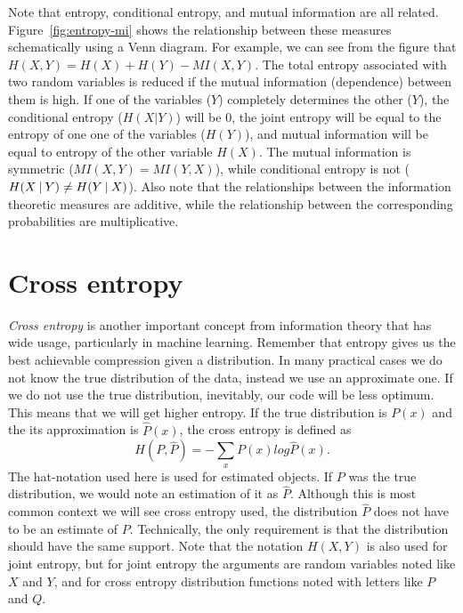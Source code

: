 Note that entropy, conditional entropy, and mutual information are all related.
Figure~\ref{fig:entropy-mi} shows the relationship between these measures
schematically using a Venn diagram.
For example, we can see from the figure that $H(X,Y) = H(X) + H(Y) - MI(X,Y)$.
The total entropy associated with two random variables is reduced if the 
mutual information (dependence) between them is high.
If one of the variables ($Y$) completely determines the other ($Y$),
the conditional entropy ($H(X|Y)$) will be \num{0},
the joint entropy will be equal to the entropy of one one of the variables
($H(Y)$),
and mutual information will be equal to entropy of the other variable $H(X)$.
The mutual information is symmetric ($MI(X,Y) = MI(Y,X)$),
while conditional entropy is not ($H(X\:\vert\:{}Y) \ne H(Y\:\vert\:{}X)$). 
Also note that the relationships
between the information theoretic measures are additive,
while the relationship between the corresponding probabilities are multiplicative.

\section{Cross entropy}

\emph{Cross entropy} is another important concept from information theory
that has wide usage, particularly in machine learning.
Remember that entropy gives us the best achievable compression
given a distribution.
In many practical cases we do not know the true distribution of the data,
instead we use an approximate one.
If we do not use the true distribution,
inevitably, our code will be less optimum.
This means that we will get higher entropy.
If the true distribution is $P(x)$ and the its approximation is $\hat{P}(x)$,
the cross entropy is defined as
\begin{equation}
  H(P, \hat{P}) = - \sum_{x} P(x) log \hat{P}(x) .
\end{equation}
The hat-notation used here is used for estimated objects.
If $P$ was the true distribution,
we would note an estimation of it as $\hat{P}$.
Although this is most common context we will see cross entropy used,
the distribution $\hat{P}$ does not have to be an estimate of $P$.
Technically, the only requirement is
that the distribution should have the same support.
Note that the notation $H(X, Y)$ is also used for joint entropy,
but for joint entropy the arguments are random variables
noted like $X$ and $Y$,
and for cross entropy distribution functions
noted with letters like $P$ and $Q$.


